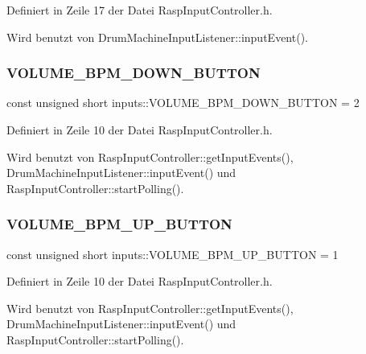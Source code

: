Definiert in Zeile 17 der Datei Rasp\+Input\+Controller.\+h.



Wird benutzt von Drum\+Machine\+Input\+Listener\+::input\+Event().

\mbox{\label{namespaceinputs_af3cad6ab00b2670e1710698945d28c17}} 
\subsubsection{\texorpdfstring{V\+O\+L\+U\+M\+E\+\_\+\+B\+P\+M\+\_\+\+D\+O\+W\+N\+\_\+\+B\+U\+T\+T\+ON}{VOLUME\_BPM\_DOWN\_BUTTON}}
{\footnotesize\ttfamily const unsigned short inputs\+::\+V\+O\+L\+U\+M\+E\+\_\+\+B\+P\+M\+\_\+\+D\+O\+W\+N\+\_\+\+B\+U\+T\+T\+ON = 2}



Definiert in Zeile 10 der Datei Rasp\+Input\+Controller.\+h.



Wird benutzt von Rasp\+Input\+Controller\+::get\+Input\+Events(), Drum\+Machine\+Input\+Listener\+::input\+Event() und Rasp\+Input\+Controller\+::start\+Polling().

\mbox{\label{namespaceinputs_ab1d58fe937ccabff6ec4011a74028bfb}} 
\subsubsection{\texorpdfstring{V\+O\+L\+U\+M\+E\+\_\+\+B\+P\+M\+\_\+\+U\+P\+\_\+\+B\+U\+T\+T\+ON}{VOLUME\_BPM\_UP\_BUTTON}}
{\footnotesize\ttfamily const unsigned short inputs\+::\+V\+O\+L\+U\+M\+E\+\_\+\+B\+P\+M\+\_\+\+U\+P\+\_\+\+B\+U\+T\+T\+ON = 1}



Definiert in Zeile 10 der Datei Rasp\+Input\+Controller.\+h.



Wird benutzt von Rasp\+Input\+Controller\+::get\+Input\+Events(), Drum\+Machine\+Input\+Listener\+::input\+Event() und Rasp\+Input\+Controller\+::start\+Polling().

